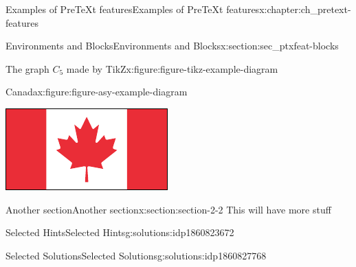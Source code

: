 \documentclass[twoside,10pt,]{book}
\numberwithin{equation}{chapter}
\providecommand\phantomsection{}
\begin{document}
\begin{chapterptx}{Examples of PreTeXt features}{}{Examples of PreTeXt features}{}{}{x:chapter:ch_pretext-features}
\begin{sectionptx}{Environments and Blocks}{}{Environments and Blocks}{}{}{x:section:sec_ptxfeat-blocks}
\begin{figureptx}{The graph \(C_5\) made by TikZ}{x:figure:figure-tikz-example-diagram}{}
\begin{image}{0.4}{0.2}{0.4}
{
}%
\end{image}%
\tcblower
\end{figureptx}%
\begin{figureptx}{Canada}{x:figure:figure-asy-example-diagram}{}%
\begin{image}{0}{1}{0}%
\includegraphics[width=\linewidth]{generated/asymptote/cflag.pdf}
\end{image}%
\tcblower
\end{figureptx}%
\end{sectionptx}
%
%
\typeout{************************************************}
\typeout{************************************************}
%
\begin{sectionptx}{Another section}{}{Another section}{}{}{x:section:section-2-2}
This will have more stuff%
\end{sectionptx}
\end{chapterptx}
%
\appendix%
%
\clearpage\phantomsection%
%
%
%
\typeout{************************************************}
\typeout{************************************************}
%
\begin{solutions-chapter}{Selected Hints}{}{Selected Hints}{}{}{g:solutions:idp1860823672}
\end{solutions-chapter}
%
%
\typeout{************************************************}
\typeout{************************************************}
%
\begin{solutions-chapter}{Selected Solutions}{}{Selected Solutions}{}{}{g:solutions:idp1860827768}
\end{solutions-chapter}
%
%
\typeout{************************************************}
\end{document}
